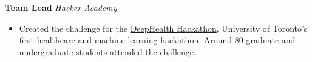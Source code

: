 \documentclass[10pt, a4paper]{cv}
\begin{document}
	\textbf{Team Lead} \hfill \emph{\href{http://hackeracademy.org}{Hacker Academy}}
	\begin{itemize}
		\item Created the challenge for the \href{https://www.facebook.com/groups/1126158850825448/}{DeepHealth Hackathon}, University of Toronto's first healthcare and machine learning hackathon. Around 80 graduate and undergraduate students attended the challenge.
	\end{itemize}
\end{document}
